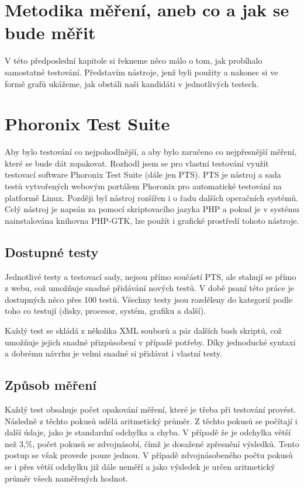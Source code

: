 \section{Metodika měření, aneb co a jak se bude měřit}
V této předposlední kapitole si řekneme něco málo o tom, jak probíhalo samostatné testování. Představím nástroje, jenž byli použity a nakonec si ve formě grafů ukážeme, jak obstáli naši kandidáti v jednotlivých testech.

\section{Phoronix Test Suite}
Aby bylo testování co nejpohodlnější, a aby bylo zaručeno co nejpřesnější měření, které se bude dát zopakovat. Rozhodl jsem se pro vlastní testování využít testovací software Phoronix Test Suite (dále jen PTS). PTS je nástroj a sada testů vytvořených webovým portálem Phoronix pro automatické testování na platformě Linux. Později byl nástroj rozšířen i o řadu dalších operačních systémů. Celý nástroj je napsán za pomocí skriptovacího jazyka PHP a pokud je v systému nainstalována knihovna PHP-GTK, lze použít i grafické prostředí tohoto nástroje.

\subsection{Dostupné testy}
Jednotlivé testy a testovací sady, nejsou přímo součástí PTS, ale stahují se přímo z webu, což umožňuje snadné přidávání nových testů. V době psaní této práce je dostupných něco přes 100 testů. Všechny testy jsou rozděleny do kategorií podle toho co testují (disky, procesor, systém, grafiku a další).

Každý test se skládá z několika XML souborů a pár dalších bash skriptů, což umožňuje jejich snadné přizpůsobení v případě potřeby. Díky jednoduché syntaxi a dobrému návrhu je velmi snadné si přidávat i vlastní testy.

\subsection{Způsob měření}
Každý test obsahuje počet opakování měření, které je třeba při testování provést. Následně z těchto pokusů udělá aritmetický průměr. Z těchto pokusů se počítají i další údaje, jako je standardní odchylka a chyba. V případě že je odchylka větší než 3,\%, počet pokusů se zdvojnásobí, čímž je dosažené zpřesnění výsledků. Tento postup se však provede pouze jednou. V případě zdvojnásobeného počtu pokusů se i přes větší odchylku již dále neměří a jako výsledek je určen aritmetický průměr všech naměřených hodnot.

